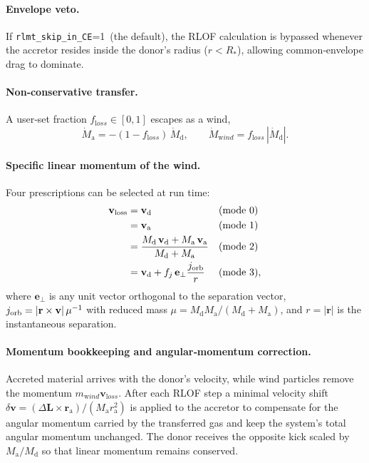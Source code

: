 \documentclass[11pt]{article}
\begin{document}
\paragraph{Envelope veto.} If \texttt{rlmt\_skip\_in\_CE}=1\ (the default), the RLOF calculation is bypassed whenever the accretor resides inside the donor’s radius ($r<R_*$), allowing common‑envelope drag to dominate.

\paragraph{Non‑conservative transfer.}
A user‑set fraction $f_{\mathrm loss}\in[0,1]$ escapes as a wind,
\begin{equation}
\dot M_{\mathrm a}=-(1-f_{\mathrm loss})\,\dot M_{\mathrm d},\qquad
\dot M_{\mathrm wind}=f_{\mathrm loss}\,|\dot M_{\mathrm d}|.
\label{eq:noncon}
\end{equation}

\paragraph{Specific linear momentum of the wind.}
Four prescriptions can be selected at run time:
\begin{subequations}\label{eq:joptions}
\begin{align}
\mathbf v_{\mathrm{loss}} &= \mathbf v_{\mathrm d} && (\text{mode }0)\\
                            &= \mathbf v_{\mathrm a} && (\text{mode }1)\\
                            &= \frac{M_{\mathrm d}\,\mathbf v_{\mathrm d}+M_{\mathrm a}\,\mathbf v_{\mathrm a}}
                               {M_{\mathrm d}+M_{\mathrm a}} && (\text{mode }2)\\
                            &= \mathbf v_{\mathrm d} + f_j\,\mathbf e_\perp
                               \frac{j_{\rm orb}}{r} && (\text{mode }3),
\end{align}
\end{subequations}
where $\mathbf e_\perp$ is any unit vector orthogonal to the separation
vector, $j_{\rm orb}=|\mathbf r\times\mathbf v|\,\mu^{-1}$ with reduced mass
$\mu=M_{\mathrm d}M_{\mathrm a}/(M_{\mathrm d}+M_{\mathrm a})$, and
$r=|\mathbf r|$ is the instantaneous separation.

\paragraph{Momentum bookkeeping and angular‑momentum correction.}
Accreted material arrives with the donor’s velocity, while wind
particles remove the momentum $m_{\mathrm wind}\mathbf v_{\mathrm loss}$.
After each RLOF step a minimal
velocity shift
\(
\delta\mathbf v=(\Delta\mathbf L\times\mathbf r_{\mathrm a})/(M_{\mathrm a}r_{\mathrm a}^2)
\)
is applied to the accretor to compensate for the angular momentum carried by
the transferred gas and keep the system’s total angular momentum unchanged.
The donor receives the opposite kick scaled by $M_{\mathrm a}/M_{\mathrm d}$ so
that linear momentum remains conserved.
\end{document}

